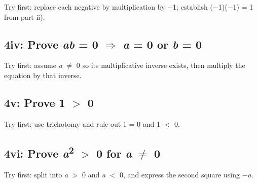 \documentclass[11pt]{article}
\begin{document}
\begin{keepsection}
\begin{keepsection}
Try first: replace each negative by multiplication by \ensuremath{-}1; establish (\ensuremath{-}1)(\ensuremath{-}1) = 1 from part ii).

\end{keepsection}

\begin{keepsection}
\subsection{4iv: Prove \textit{a}\textit{b} = 0 \ensuremath{\Rightarrow} \textit{a} = 0 or \textit{b} = 0}

Try first: assume \textit{a} \ensuremath{\neq} 0 so its multiplicative inverse exists, then multiply the equation by that inverse.

\end{keepsection}

\begin{keepsection}
\subsection{4v: Prove 1 \ensuremath{>} 0}

Try first: use trichotomy and rule out 1 = 0 and 1 \ensuremath{<} 0.

\end{keepsection}

\begin{keepsection}
\subsection{4vi: Prove \textit{a}\textsuperscript{2} \ensuremath{>} 0 for \textit{a} \ensuremath{\neq} 0}

Try first: split into \textit{a} \ensuremath{>} 0 and \textit{a} \ensuremath{<} 0, and express the second square using \ensuremath{-}\textit{a}.

\end{keepsection}


\end{keepsection}
\end{document}
